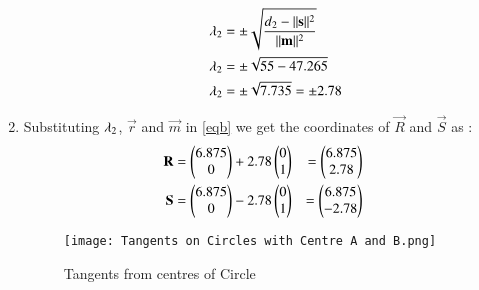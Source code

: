 \documentclass[journal,12pt,twocolumn]{IEEEtran}
\begin{document}
\begin{enumerate}
\begin{itemize}
\begin{align}
\lambda\textsubscript{2} &= \pm\sqrt{\frac {d\textsubscript{2}-\lVert\mathbf{s}\rVert^2}{\lVert\mathbf{m}\rVert^2}}
\\
\lambda\textsubscript{2} &= \pm\sqrt{55-47.265}
\\
\lambda\textsubscript{2} &= \pm\sqrt{7.735}=\pm 2.78
\end{align}
\end{itemize}
\item Substituting $\lambda\textsubscript{2}$, $\vec{r}$ and $\vec{m}$ in \eqref{eqb} we get the coordinates of $\vec{R}$ and  $\vec{S}$ as :
\begin{align}
\mathbf{R}&=\begin{pmatrix}6.875\\0\end{pmatrix}+ 2.78\begin{pmatrix}0\\1\end{pmatrix}&=\begin{pmatrix}6.875\\2.78\end{pmatrix}
\\
\mathbf{S}&=\begin{pmatrix}6.875\\0\end{pmatrix}- 2.78\begin{pmatrix}0\\1\end{pmatrix}&=\begin{pmatrix}6.875\\-2.78\end{pmatrix}
\end{align}




\begin{figure}[H]
\centering
\texttt{[image: Tangents on Circles with Centre A and B.png]}
\caption{Tangents from centres of Circle}
\label{fig:circle}	
\end{figure}
\end{enumerate}
\end{document}
